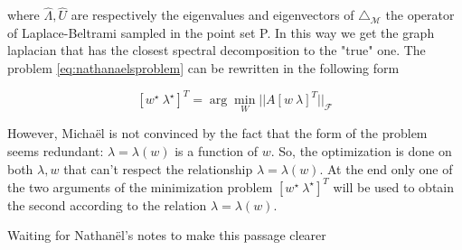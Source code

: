 where $\hat{\Lambda}, \hat{U}$ are respectively the eigenvalues and eigenvectors of $\triangle_\mathcal M$ the operator of Laplace-Beltrami sampled in the point set P. In this way we get the graph laplacian that has the closest spectral decomposition to the "true" one. The problem \ref{eq:nathanaelsproblem} can be rewritten in the following form 

\begin{equation}\label{eq:nathanaelsproblem2}
[w^\star\ \lambda^\star]^T = \arg\min_W||A[w\ \lambda]^T||_\mathcal F
\end{equation}

However, Micha\"el is not convinced by the fact that the form of the problem seems redundant: $\lambda=\lambda(w)$ is a function of $w$. So, the optimization is done on both $\lambda, w$ that can't respect the relationship $\lambda=\lambda(w)$. At the end only one of the two arguments of the minimization problem $[w^\star\ \lambda^\star]^T$ will be used to obtain the second according to the relation $\lambda=\lambda(w)$.

Waiting for Nathan\"el's notes to make this passage clearer










